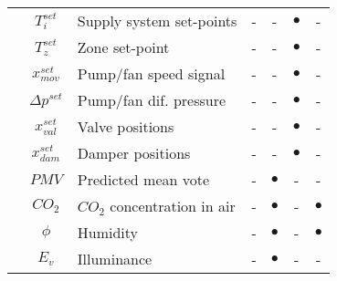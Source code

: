 \documentclass[10pt]{extarticle}
\begin{document}
\begin{table}[h]
\begin{tabular}{l|c|l|cccc}
		\midrule
		 &
		$T^{set}_{i}$ & Supply system set-points & - & - & $\bullet$ & - \\
		& $T^{set}_{z}$ & Zone set-point & - & - & $\bullet$ & - \\
		& $x^{set}_{mov}$ & Pump/fan speed signal & - & - & $\bullet$ & - \\
		& $\Delta p^{set}$ & Pump/fan dif. pressure & - & - & $\bullet$ & - \\
		& $x^{set}_{val}$ & Valve positions & - & - & $\bullet$ & - \\
		& $x^{set}_{dam}$ & Damper positions & - & - & $\bullet$ & - \\
		\midrule
		 &
		$PMV$ & Predicted mean vote & - & $\bullet$ & - & - \\
		& $CO_2$ & $CO_2$ concentration in air & - & $\bullet$ & - & $\bullet$ \\
		& $\phi$ & Humidity & - & $\bullet$ & - & $\bullet$ \\
		& $E_v$ & Illuminance & - & $\bullet$ & - & - \\
		\bottomrule 
	\end{tabular}
\end{table} 
\end{document}

